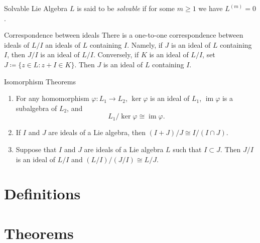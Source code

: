 \documentclass[12pt]{article}
\DeclareMathOperator{\im}{im}
\begin{document}
\begin{def-entry}[solvable]{Solvable Lie Algebra}
  $L$ is said to be \textit{solvable} if for some $m \geq 1$ we have $L^{(m)}= 0$.
\end{def-entry}


\begin{thm-entry}{Correspondence between ideals}
    There is a one-to-one correspondence between ideals of $L/I$ an ideals of $L$ containing $I$.
    Namely, if $J$ is an ideal of $L$ containing $I$, then $J/I$ is an ideal of $L/I$.
    Conversely, if $K$ is an ideal of $L/I$, set $J \coloneq\lbrace z \in L : z + I \in K \rbrace$.
    Then $J$ is an ideal of $L$ containing $I$.
\end{thm-entry}

\begin{thm-entry}{Isomorphism Theorems}
    \begin{enumerate}
        \item For any homomorphism $\varphi : L_1 \to L_2$, $\ker\varphi$ is an ideal of $L_1$, $\im\varphi$ is a subalgebra of $L_2$, and $$L_1 / \ker\varphi \cong \im\varphi.$$
        \item If $I$ and $J$ are ideals of a Lie algebra, then $(I + J) / J \cong I / (I \cap J)$.
        \item Suppose that $I$ and $J$ are ideals of a Lie algebra $L$ such that $I \subset J$. Then $J/I$ is an ideal of $L/I$ and $(L/I)/(J/I) \cong L/J$.
    \end{enumerate}
\end{thm-entry}

{\centering\section*{Definitions}}
\printdefentries

{\centering\section*{Theorems}}
\printthmentries
\end{document}
